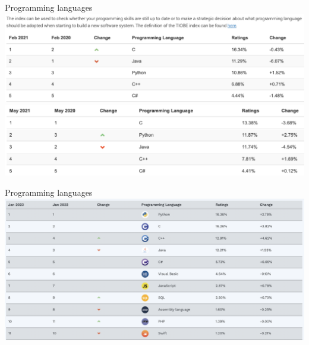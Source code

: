 \documentclass{beamer}%
\begin{document}
\begin{frame}{Programming languages}
	{\scriptsize{}}
	\includegraphics[scale=0.35]{figures/tiobe02_2021}\\
	\vspace{0.5cm}
	\pause
	\hspace{-0.34cm}\includegraphics[scale=0.28]{figures/tiobe05_2021}
	\centering
\end{frame}

\begin{frame}{Programming languages}
		\centering
	{\scriptsize{}}
	\includegraphics[scale=0.24]{figures/tiobe01_23.png}\\
\end{frame}
\end{document}
